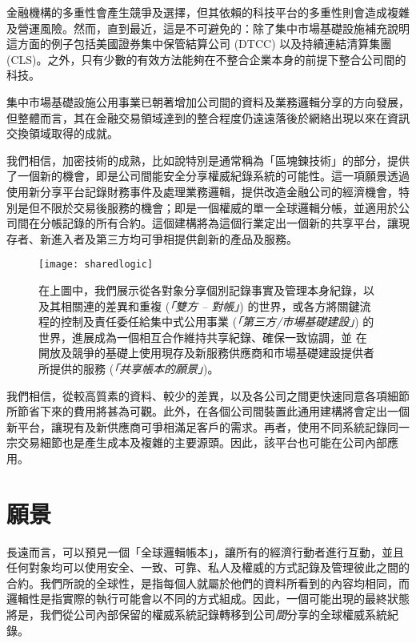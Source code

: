 \documentclass[UTF8]{ctexart}
\begin{document}
金融機構的多重性會產生競爭及選擇，但其依賴的科技平台的多重性則會造成複雜及營運風險。然而，直到最近，這是不可避免的：除了集中市場基礎設施補充說明{這方面的例子包括美國證券集中保管結算公司 (DTCC) 以及持續連結清算集團 (CLS)。}之外，只有少數的有效方法能夠在不整合企業本身的前提下整合公司間的科技。

集中市場基礎設施公用事業已朝著增加公司間的資料及業務邏輯分享的方向發展，但整體而言，其在金融交易領域達到的整合程度仍遠遠落後於網絡出現以來在資訊交換領域取得的成就。\cite{IT}

我們相信，加密技術的成熟，比如說特別是通常稱為「區塊鍊技術」的部分，提供了一個新的機會，即是公司間能安全分享權威紀錄系統的可能性。這一項願景透過使用新分享平台記錄財務事件及處理業務邏輯，提供改造金融公司的經濟機會，特別是但不限於交易後服務的機會；即是一個權威的單一全球邏輯分帳，並適用於公司間在分帳記錄的所有合約。這個建構將為這個行業定出一個新的共享平台，讓現存者、新進入者及第三方均可爭相提供創新的產品及服務。 

\begin{figure}[H]
\texttt{[image: sharedlogic]} 
\caption{在上圖中，我們展示從各對象分享個別記錄事實及管理本身紀錄，以及其相關連的差異和重複 (\textit{「雙方 – 對帳」}) 的世界，或各方將關鍵流程的控制及責任委任給集中式公用事業 (\textit{「第三方/市場基礎建設」}) 的世界，進展成為一個相互合作維持共享紀錄、確保一致協調，並 在開放及競爭的基礎上使用現存及新服務供應商和市場基礎建設提供者所提供的服務 (\textit{「共享帳本的願景」})。}
\end{figure}


我們相信，從較高質素的資料、較少的差異，以及各公司之間更快速同意各項細節所節省下來的費用將甚為可觀。此外，在各個公司間裝置此通用建構將會定出一個新平台，讓現有及新供應商可爭相滿足客戶的需求。再者，使用不同系統記錄同一宗交易細節也是產生成本及複雜的主要源頭。因此，該平台也可能在公司內部應用。

\section{願景}
長遠而言，可以預見一個「全球邏輯帳本」，讓所有的經濟行動者進行互動，並且任何對象均可以使用安全、一致、可靠、私人及權威的方式記錄及管理彼此之間的合約。我們所說的全球性，是指每個人就屬於他們的資料所看到的內容均相同，而邏輯性是指實際的執行可能會以不同的方式組成。因此，一個可能出現的最終狀態將是，我們從公司內部保留的權威系統記錄轉移到公司\textit{間}分享的全球權威系統紀錄。 
\end{document}
